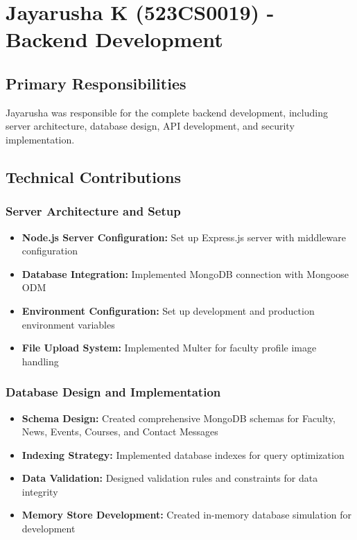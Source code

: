 \documentclass[12pt,a4paper]{report}
\begin{document}
\section{Jayarusha K (523CS0019) - Backend Development}

\subsection{Primary Responsibilities}
Jayarusha was responsible for the complete backend development, including server architecture, database design, API development, and security implementation.

\subsection{Technical Contributions}

\subsubsection{Server Architecture and Setup}
\begin{itemize}
    \item \textbf{Node.js Server Configuration:} Set up Express.js server with middleware configuration
    \item \textbf{Database Integration:} Implemented MongoDB connection with Mongoose ODM
    \item \textbf{Environment Configuration:} Set up development and production environment variables
    \item \textbf{File Upload System:} Implemented Multer for faculty profile image handling
\end{itemize}

\subsubsection{Database Design and Implementation}
\begin{itemize}
    \item \textbf{Schema Design:} Created comprehensive MongoDB schemas for Faculty, News, Events, Courses, and Contact Messages
    \item \textbf{Indexing Strategy:} Implemented database indexes for query optimization
    \item \textbf{Data Validation:} Designed validation rules and constraints for data integrity
    \item \textbf{Memory Store Development:} Created in-memory database simulation for development
\end{itemize}
\end{document}
